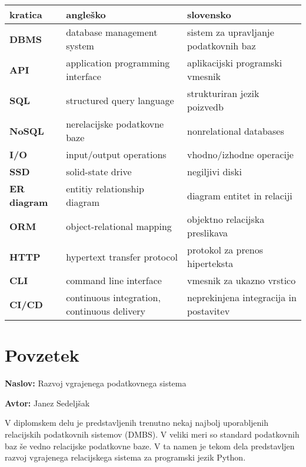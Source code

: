 \documentclass[a4paper,12pt,openright]{book}
\newcommand{\ttitle}{Razvoj vgrajenega podatkovnega sistema}
\newcommand{\tauthor}{Janez Sedeljšak}
\newcommand{\clearemptydoublepage}{\newpage{\pagestyle{empty}\cleardoublepage}}
\begin{document}
\noindent\begin{tabular}{p{}|p{}|p{}}    %
  {\bf kratica} & {\bf angleško}                              & {\bf slovensko} \\ \hline
  {\bf DBMS} & database management system & sistem za upravljanje podatkovnih baz \\
  {\bf API} & application programming interface & aplikacijski programski vmesnik \\
  {\bf SQL} & structured query language & strukturiran jezik poizvedb \\
  {\bf NoSQL} & nerelacijske podatkovne baze & nonrelational databases \\
  {\bf I/O} & input/output operations & vhodno/izhodne operacije \\
  {\bf SSD} & solid-state drive & negiljivi diski \\
  {\bf ER diagram} & entitiy relationship diagram & diagram entitet in relaciji \\
  {\bf ORM} & object-relational mapping & objektno relacijska preslikava \\
  {\bf HTTP} & hypertext transfer protocol & protokol za prenos hiperteksta \\
  {\bf CLI} & command line interface & vmesnik za ukazno vrstico \\
  {\bf CI/CD} & continuous integration, continuous delivery & neprekinjena integracija in postavitev \\
\end{tabular}


\clearemptydoublepage

{}
\chapter*{Povzetek}

\noindent\textbf{Naslov:} \ttitle
\bigskip

\noindent\textbf{Avtor:} \tauthor
\bigskip

\noindent V diplomskem delu je predstavljenih trenutno nekaj najbolj uporabljenih relacijskih podatkovnih sistemov (DMBS). V veliki meri so standard podatkovnih baz še vedno relacijske podatkovne baze. V ta namen je tekom dela predstavljen razvoj vgrajenega relacijskega sistema za programski jezik Python.
\end{document}
